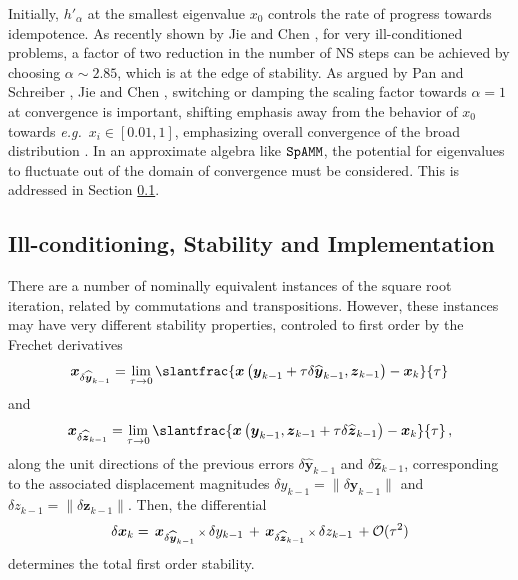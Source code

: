 \documentclass[letterpaper,twocolumn,amsmath,amsfont,amssymb,english,aps,jcp,preprintnumbers,groupaddress,nofootinbib,tightenlines]{revtex4}
\newcommand{\mat}[1]{\boldsymbol{#1}}
\begin{document}
Initially, $h'_\alpha$ at the smallest eigenvalue $x_0$ controls the
rate of progress towards idempotence.  As recently shown by Jie and
Chen \cite{Chen2014}, for very ill-conditioned problems, a factor of
two reduction in the number of NS steps can be achieved by choosing
$\alpha \sim 2.85$, which is at the edge of stability.  As argued by
Pan and Schreiber \cite{Pan1991}, Jie and Chen \cite{Chen2014},
switching or damping the scaling factor towards $\alpha=1$ at
convergence is important, shifting emphasis away from the behavior of
$x_0$ towards {\em e.g.}~$x_i \in [0.01,1]$, emphasizing overall
convergence of the broad distribution \cite{Pan and Scriber}.  In an
approximate algebra like $\tt SpAMM$, the potential for eigenvalues to
fluctuate out of the domain of convergence must be considered.  This
is addressed in Section \ref{}.

\subsection{Ill-conditioning, Stability and Implementation}

There are a number of nominally equivalent instances of the square root iteration, related by commutations and transpositions. 
However, these instances may have very different stability properties,  controled to first order by the Frechet derivatives
\begin{equation}
  \mat{x}_{\delta \widehat{ \mat{y}}_{k-1}}
= \lim_{\tau \rightarrow 0} \slantfrac{ \mat{x} \left( \mat{y}_{k-1} + \tau \delta \widehat{\mat{y}}_{k-1} ,  {\mat{z}}_{k-1}  \right)
                                     -\mat{x}_k    }{\tau} 
 \end{equation}
and
 \begin{equation}
 \mat{x}_{\delta \widehat{ \mat{z}}_{k-1}} = \lim_{\tau \rightarrow 0}
\slantfrac{ \mat{x} \left( {\mat{y}}_{k-1} , \mat{z}_{k-1} +\tau  \delta \widehat{\mat{z}}_{k-1} \right) - \mat{x}_k   }{\tau}  \, , 
 \end{equation}
along the unit directions of the previous errors $\delta \widehat{\mat{y}}_{k-1}$ and $\delta \widehat{\mat{z}}_{k-1}$, corresponding 
to the associated displacement magnitudes $\delta y_{k-1} = \lVert \delta \mat{y}_{k-1} \rVert$  and  $\delta z_{k-1}=\lVert \delta \mat{z}_{k-1} \rVert$.
Then, the differential 
\begin{equation} \label{firstorderdual}
\delta \mat{x}_k = \,  { \mat{x}}_{\delta \widehat{\mat{y}}_{k-1}}  \, {\scriptstyle \times} \, \delta y_{k-1}
                 \, + \,  { \mat{x}}_{\delta \widehat{\mat{z}}_{k-1}}  \, {\scriptstyle \times} \, \delta z_{k-1}  \, + {\cal O}(\tau^2) 
\end{equation}
determines the total first order stability. 
\end{document}
